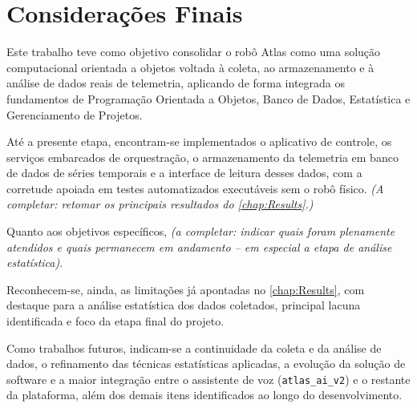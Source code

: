 \chapter{Considerações Finais}\label{chap:conclusao}


Este trabalho teve como objetivo consolidar o robô Atlas como uma solução computacional orientada a objetos voltada à coleta, ao armazenamento e à análise de dados reais de telemetria, aplicando de forma integrada os fundamentos de Programação Orientada a Objetos, Banco de Dados, Estatística e Gerenciamento de Projetos.

Até a presente etapa, encontram-se implementados o aplicativo de controle, os serviços embarcados de orquestração, o armazenamento da telemetria em banco de dados de séries temporais e a interface de leitura desses dados, com a corretude apoiada em testes automatizados executáveis sem o robô físico. \textit{(A completar: retomar os principais resultados do \autoref{chap:Results}.)}

Quanto aos objetivos específicos, \textit{(a completar: indicar quais foram plenamente atendidos e quais permanecem em andamento -- em especial a etapa de análise estatística)}.

Reconhecem-se, ainda, as limitações já apontadas no \autoref{chap:Results}, com destaque para a análise estatística dos dados coletados, principal lacuna identificada e foco da etapa final do projeto.

Como trabalhos futuros, indicam-se a continuidade da coleta e da análise de dados, o refinamento das técnicas estatísticas aplicadas, a evolução da solução de software e a maior integração entre o assistente de voz (\texttt{atlas\_ai\_v2}) e o restante da plataforma, além dos demais itens identificados ao longo do desenvolvimento.
